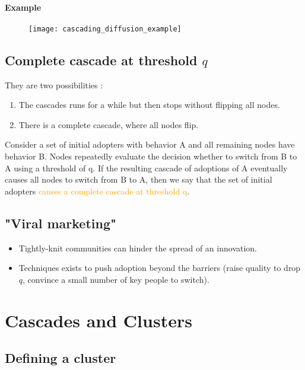 \paragraph{Example}

\begin{figure}[H]
    \centering
    \texttt{[image: cascading\_diffusion\_example]}
\end{figure}

\subsection{Complete cascade at threshold $q$}

They are two possibilities :
\begin{enumerate}
\item The cascades runs for a while but then stops without flipping all nodes.
\item There is a complete cascade, where all nodes flip.
\end{enumerate}

Consider a set of initial adopters with behavior A and all remaining nodes have behavior B. Nodes repeatedly evaluate the decision whether to switch from B to A using a threshold of q. If the resulting cascade of adoptions of A eventually causes all nodes to switch from B to A, then we say that the set of initial adopters \textcolor{orange}{causes a complete cascade at threshold q}.

\subsection{"Viral marketing"}

\begin{itemize}
\item Tightly-knit communities can hinder the spread of an innovation.
\item Techniques exists to push adoption beyond the barriers (raise quality to drop $q$, convince a small number of key people to switch).
\end{itemize}

\section{Cascades and Clusters}

\subsection{Defining a cluster}

